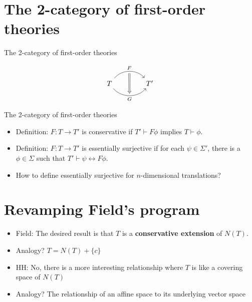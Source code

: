 \documentclass{beamer}
\begin{document}
\section{The 2-category of first-order theories}



\begin{frame}[fragile]{The 2-category of first-order theories}

\[
\begin{tikzcd}[row sep=2.5em, column sep=4em]
T \arrow[bend left=50]{r}[name=U]{F} \arrow[bend right=50]{r}[name=D,
below]{G} & T' \arrow[Rightarrow, from=U, to=D, shorten >=3pt, shorten <=3pt]
\end{tikzcd}
\]


\end{frame}

\begin{frame}{The 2-category of first-order theories}

  \begin{itemize}
  \item Definition: $F:T\to T'$ is conservative if $T'\vdash F\phi$
    implies $T\vdash \phi$.
  \item Definition: $F:T\to T'$ is essentially surjective if for each
    $\psi\in \Sigma '$, there is a $\phi\in \Sigma$ such that
    $T'\vdash \psi \leftrightarrow F\phi$.
  \item How to define essentially surjective for $n$-dimensional
    translations?
  \end{itemize}

\end{frame}



\section{Revamping Field's program}

\begin{frame}

  \begin{itemize}
  \item Field: The desired result is that $T$ is a
    \textbf{conservative extension} of $N(T)$.
  \item Analogy? $T=N(T)+\{ c\}$
  \item HH: No, there is a more interesting relationship where $T$ is
    like a covering space of $N(T)$
  \item Analogy? The relationship of an affine space to its underlying
    vector space
  \end{itemize}

\end{frame}
\end{document}
